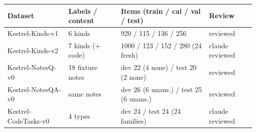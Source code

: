 \begin{tabular}{llll}
\toprule
Dataset & Labels / content & Items (train / cal / val / test) & Review \\
\midrule
Kestrel-Kinds-v1 & 6 kinds & 920 / 115 / 136 / 256 & reviewed \\
Kestrel-Kinds-v2 & 7 kinds (+ code) & 1000 / 123 / 152 / 280 (24 fresh) & claude reviewed \\
Kestrel-NotesQ-v0 & 18 fixture notes & dev 22 (4 none) / test 20 (2 none) & reviewed \\
Kestrel-NotesQA-v0 & same notes & dev 26 (6 unans.) / test 25 (6 unans.) & reviewed \\
Kestrel-CodeTasks-v0 & 4 types & dev 24 / test 24 (24 families) & claude reviewed \\
\bottomrule
\end{tabular}
